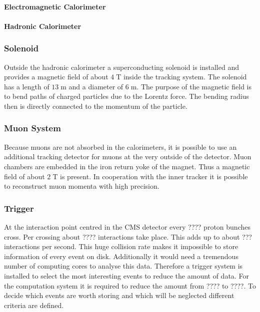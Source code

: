 \paragraph{Electromagnetic Calorimeter}
\paragraph{Hadronic Calorimeter}
	
\subsubsection{Solenoid}
	Outside the hadronic calorimeter a superconducting solenoid is installed and provides a magnetic field of about $4\;\text{T}$ inside the tracking system. The solenoid has a length of $13\;\text{m}$ and a diameter of $6\;\text{m}$. The purpose of the magnetic field is to bend paths of charged particles due to the Lorentz force. The bending radius then is directly connected to the momentum of the particle.  
\subsubsection{Muon System}
	Because muons are not absorbed in the calorimeters, it is possible to use an additional tracking detector for muons at the very outside of the detector. Muon chambers are embedded in the iron return yoke of the magnet. Thus a magnetic field of about $2\;\text{T}$ is present.
	In cooperation with the inner tracker it is possible to reconstruct muon momenta with high precision.
\subsubsection{Trigger}
	At the interaction point centred in the CMS detector every ???? 
	proton bunches cross. Per crossing about ????
	interactions take place. This adds up to about ???
	interactions per second. This huge collision rate makes it impossible to store information of every event on disk. Additionally it would need a tremendous number of computing cores to analyse this data. Therefore a trigger system is installed to select the most interesting events to reduce the amount of data. For the computation system it is required to reduce the amount from ???? to ????.
 	To decide which events are worth storing and which will be neglected different criteria are defined.
	
	